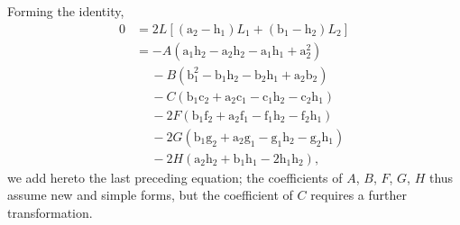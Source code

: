 \documentclass[11pt,a4paper]{article}
\begin{document}
\medskip
Forming the identity,
\begin{align*}
0 &= 2L[(\text{a}_{2} - \text{h}_{1})L_{1} + (\text{b}_{1} - \text{h}_{2})L_{2}]\\
  &= - A(\text{a}_{1}\text{h}_{2} - \text{a}_{2}\text{h}_{2} - \text{a}_{1}\text{h}_{1} + \text{a}_{2}^{2})\\
  &\quad\ - B(\text{b}_{1}^{2} - \text{b}_{1}\text{h}_{2} - \text{b}_{2}\text{h}_{1} + \text{a}_{2}\text{b}_{2})\\
  &\quad\ - C(\text{b}_{1}\text{c}_{2} + \text{a}_{2}\text{c}_{1} - \text{c}_{1}\text{h}_{2} - \text{c}_{2}\text{h}_{1})\\
  &\quad\ - 2F(\text{b}_{1}\text{f}_{2} + \text{a}_{2}\text{f}_{1} - \text{f}_{1}\text{h}_{2} - \text{f}_{2}\text{h}_{1})\\
  &\quad\ - 2G(\text{b}_{1}\text{g}_{2} + \text{a}_{2}\text{g}_{1} - \text{g}_{1}\text{h}_{2} - \text{g}_{2}\text{h}_{1})\\
  &\quad\ - 2H(\text{a}_{2}\text{h}_{2} + \text{b}_{1}\text{h}_{1} - 2\text{h}_{1}\text{h}_{2}),
\end{align*}
we add hereto the last preceding equation; the coefficients of $A$, $B$, $F$, $G$, $H$ thus assume new and simple forms, but the coefficient of $C$ requires a further transformation.
\end{document}
